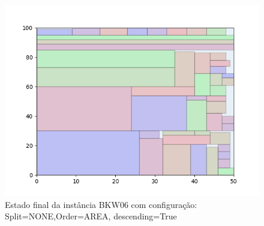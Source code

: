 \begin{figure}[H]
    \centering
    \caption[]{Estado final da instância BKW06 com configuração: Split=NONE,Order=AREA, descending=True}
    \label{fig:bkw06-none-area-true}
    \includegraphics[scale=0.5]{output/figures/bkw/bkw06/none/area/true/00}
\end{figure}